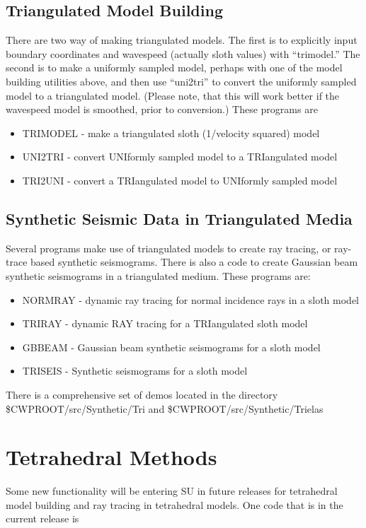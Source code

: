 {{{{{{{\subsection{Triangulated Model Building}
There are two way of making triangulated models. The first
is to explicitly input boundary coordinates and wavespeed (actually
sloth values) with ``trimodel.'' The second is to make a uniformly
sampled model, perhaps with one of the model building utilities
above, and then use ``uni2tri'' to convert the uniformly sampled
model to a triangulated model. (Please note, that this will work
better if the wavespeed model is smoothed, prior to conversion.)
These programs are
\begin{itemize} 
\item TRIMODEL - make a triangulated sloth (1/velocity squared) model
\item UNI2TRI - convert UNIformly sampled model to a TRIangulated model
\item TRI2UNI - convert a TRIangulated model to UNIformly sampled model
\end{itemize}

\subsection{Synthetic Seismic Data in Triangulated Media}

Several programs make use of triangulated models to create ray
tracing, or ray-trace based synthetic seismograms.
There is also a code to create Gaussian beam synthetic seismograms
in a triangulated medium. 
These programs are:
\begin{itemize} 
\item NORMRAY - dynamic ray tracing for normal incidence rays in a sloth model
\item TRIRAY - dynamic RAY tracing for a TRIangulated sloth model 
\item GBBEAM - Gaussian beam synthetic seismograms for a sloth model
\item TRISEIS - Synthetic seismograms for a sloth model 
\end{itemize}

There is a comprehensive set of demos located in the directory
\$CWPROOT/src/Synthetic/Tri and 
\$CWPROOT/src/Synthetic/Trielas

\section{Tetrahedral Methods}
Some new functionality will be entering SU in future releases
for tetrahedral model building and ray tracing in tetrahedral models.
One code that is in the current release is

}}}}}}}

